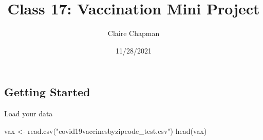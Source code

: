 \documentclass[
]{article}
\title{Class 17: Vaccination Mini Project}
\author{Claire Chapman}
\date{11/28/2021}
\newenvironment{Shaded}{\begin{snugshade}}{\end{snugshade}}
\newcommand{\FunctionTok}[1]{\textcolor[rgb]{0.00,0.00,0.00}{#1}}
\newcommand{\NormalTok}[1]{#1}
\newcommand{\OtherTok}[1]{\textcolor[rgb]{0.56,0.35,0.01}{#1}}
\newcommand{\StringTok}[1]{\textcolor[rgb]{0.31,0.60,0.02}{#1}}
\begin{document}
\maketitle

\hypertarget{getting-started}{%
\subsection{Getting Started}\label{getting-started}}

Load your data

\begin{Shaded}
\begin{Highlighting}[]
\NormalTok{vax }\OtherTok{\textless{}{-}} \FunctionTok{read.csv}\NormalTok{(}\StringTok{"covid19vaccinesbyzipcode\_test.csv"}\NormalTok{)}
\FunctionTok{head}\NormalTok{(vax)}
\end{Highlighting}
\end{Shaded}
\end{document}
